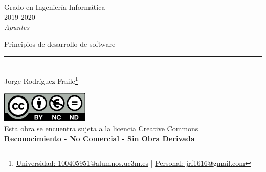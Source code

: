\documentclass[12pt, twoside, openright]{report} %
\begin{document}
	
\begin{titlepage}
	\begin{sffamily}
	\color{azulUC3M}
	\begin{center}
		\begin{figure}[H] %
		\end{figure}
		\vspace{2.5cm}
		\begin{Large}
			Grado en Ingeniería Informática\\			
			2019-2020\\
			\vspace{2cm}		
			\textsl{Apuntes}\\
			\bigskip
		\end{Large}
		 	{\Huge Principios de desarrollo de software}\\
		 	\vspace*{0.5cm}
	 		\rule{10.5cm}{0.1mm}\\
			\vspace*{0.9cm}
			{\LARGE Jorge Rodríguez Fraile\footnote{\href{mailto:100405951@alumnos.uc3m.es}{Universidad: 100405951@alumnos.uc3m.es}  |  \href{mailto:jrf1616@gmail.com}{Personal: jrf1616@gmail.com}}}\\ 
			\vspace*{1cm}
	\end{center}
	\vfill
	\color{black}
		\includegraphics[width=4.2cm]{img/creativecommons.png}\\
		Esta obra se encuentra sujeta a la licencia Creative Commons\\ \textbf{Reconocimiento - No Comercial - Sin Obra Derivada}
	\end{sffamily}
\end{titlepage}


\tableofcontents
\thispagestyle{fancy}
\end{document}
